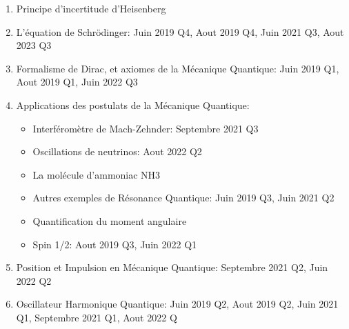 \documentclass[a4paper,10pt]{book}
\begin{document}
\begin{enumerate}
    \item Principe d'incertitude d'Heisenberg
    \item L'équation de Schrödinger: Juin 2019 Q4, Aout 2019 Q4, Juin 2021 Q3, Aout 2023 Q3
    \item Formalisme de Dirac, et axiomes de la Mécanique Quantique: Juin 2019 Q1, Aout 2019 Q1, Juin 2022 Q3
    \item Applications des postulats de la Mécanique Quantique: 
    \begin{itemize}[label=\textbullet]
        \item Interféromètre de Mach-Zehnder: Septembre 2021 Q3
        \item Oscillations de neutrinos: Aout 2022 Q2
        \item La molécule d'ammoniac NH3
        \item Autres exemples de Résonance Quantique: Juin 2019 Q3, Juin 2021 Q2
        \item Quantification du moment angulaire
        \item Spin 1/2: Aout 2019 Q3, Juin 2022 Q1
    \end{itemize}
    \item Position et Impulsion en Mécanique Quantique: Septembre 2021 Q2, Juin 2022 Q2
    \item Oscillateur Harmonique Quantique: Juin 2019 Q2, Aout 2019 Q2, Juin 2021 Q1, Septembre 2021 Q1, Aout 2022 Q
\end{enumerate}












\end{document}
